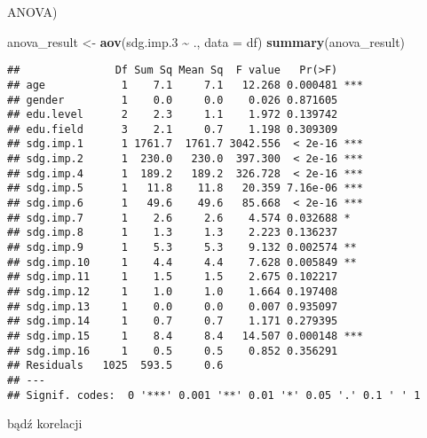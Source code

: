\documentclass[
]{article}
\newenvironment{Shaded}{\begin{snugshade}}{\end{snugshade}}
\newcommand{\AttributeTok}[1]{\textcolor[rgb]{0.13,0.29,0.53}{#1}}
\newcommand{\FloatTok}[1]{\textcolor[rgb]{0.00,0.00,0.81}{#1}}
\newcommand{\FunctionTok}[1]{\textcolor[rgb]{0.13,0.29,0.53}{\textbf{#1}}}
\newcommand{\NormalTok}[1]{#1}
\newcommand{\OtherTok}[1]{\textcolor[rgb]{0.56,0.35,0.01}{#1}}
\newcommand{\SpecialCharTok}[1]{\textcolor[rgb]{0.81,0.36,0.00}{\textbf{#1}}}
\begin{document}
ANOVA)

\begin{Shaded}
\begin{Highlighting}[]
\NormalTok{anova\_result }\OtherTok{\textless{}{-}} \FunctionTok{aov}\NormalTok{(sdg.imp}\FloatTok{.3} \SpecialCharTok{\textasciitilde{}}\NormalTok{ ., }\AttributeTok{data =}\NormalTok{ df)}
\FunctionTok{summary}\NormalTok{(anova\_result)}
\end{Highlighting}
\end{Shaded}

\begin{verbatim}
##               Df Sum Sq Mean Sq  F value   Pr(>F)    
## age            1    7.1     7.1   12.268 0.000481 ***
## gender         1    0.0     0.0    0.026 0.871605    
## edu.level      2    2.3     1.1    1.972 0.139742    
## edu.field      3    2.1     0.7    1.198 0.309309    
## sdg.imp.1      1 1761.7  1761.7 3042.556  < 2e-16 ***
## sdg.imp.2      1  230.0   230.0  397.300  < 2e-16 ***
## sdg.imp.4      1  189.2   189.2  326.728  < 2e-16 ***
## sdg.imp.5      1   11.8    11.8   20.359 7.16e-06 ***
## sdg.imp.6      1   49.6    49.6   85.668  < 2e-16 ***
## sdg.imp.7      1    2.6     2.6    4.574 0.032688 *  
## sdg.imp.8      1    1.3     1.3    2.223 0.136237    
## sdg.imp.9      1    5.3     5.3    9.132 0.002574 ** 
## sdg.imp.10     1    4.4     4.4    7.628 0.005849 ** 
## sdg.imp.11     1    1.5     1.5    2.675 0.102217    
## sdg.imp.12     1    1.0     1.0    1.664 0.197408    
## sdg.imp.13     1    0.0     0.0    0.007 0.935097    
## sdg.imp.14     1    0.7     0.7    1.171 0.279395    
## sdg.imp.15     1    8.4     8.4   14.507 0.000148 ***
## sdg.imp.16     1    0.5     0.5    0.852 0.356291    
## Residuals   1025  593.5     0.6                      
## ---
## Signif. codes:  0 '***' 0.001 '**' 0.01 '*' 0.05 '.' 0.1 ' ' 1
\end{verbatim}

bądź korelacji
\end{document}
